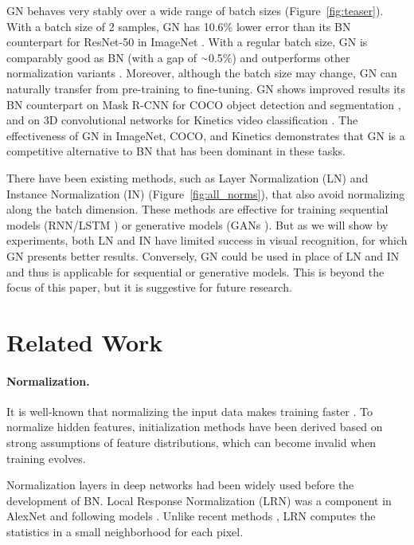 \documentclass[10pt,twocolumn,letterpaper]{article}
\newcommand{\app}{\raise.17ex\hbox{$\scriptstyle\sim$}}
\begin{document}
GN behaves very stably over a wide range of batch sizes (Figure~\ref{fig:teaser}).
With a batch size of 2 samples, GN has 10.6\% lower error than its BN counterpart for ResNet-50 \cite{He2016} in ImageNet \cite{Russakovsky2015}. With a regular batch size, GN is comparably good as BN (with a gap of $\app$0.5\%) and outperforms other normalization variants \cite{Ba2016,Ulyanov2016,Salimans2016}. Moreover, although the batch size may change, GN can naturally transfer from pre-training to fine-tuning.
GN shows improved results \vs its BN counterpart on Mask R-CNN for COCO object detection and segmentation \cite{Lin2014}, and on 3D convolutional networks for Kinetics video classification \cite{Kay2017}. The effectiveness of GN in ImageNet, COCO, and Kinetics demonstrates that GN is a competitive alternative to BN that has been dominant in these tasks.

There have been existing methods, such as Layer Normalization (LN) \cite{Ba2016} and Instance Normalization (IN) \cite{Ulyanov2016} (Figure~\ref{fig:all_norms}), that also avoid normalizing along the batch dimension.
These methods are effective for training sequential models (RNN/LSTM \cite{Rumelhart1986,Hochreiter1997}) or generative models (GANs \cite{Goodfellow2014,Isola2017}).
But as we will show by experiments, both LN and IN have limited success in visual recognition, for which GN presents better results.
Conversely, GN could be used in place of LN and IN and thus is applicable for sequential or generative models. This is beyond the focus of this paper, but it is suggestive for future research.


\section{Related Work}

\paragraph{Normalization.} It is well-known that normalizing the input data makes training faster \cite{LeCun1998}. To normalize hidden features, initialization methods \cite{LeCun1998,Glorot2010,He2015} have been derived based on strong assumptions of feature distributions, which can become invalid when training evolves.

Normalization layers in deep networks had been widely used before the development of BN. Local Response Normalization (LRN) \cite{Lyu2008,Jarrett2009,Krizhevsky2012} was a component in AlexNet \cite{Krizhevsky2012} and following models \cite{Zeiler2014,Sermanet2014,Szegedy2015}. Unlike recent methods \cite{Ioffe2015,Ba2016,Ulyanov2016}, LRN computes the statistics in a small neighborhood for each pixel.
\end{document}
